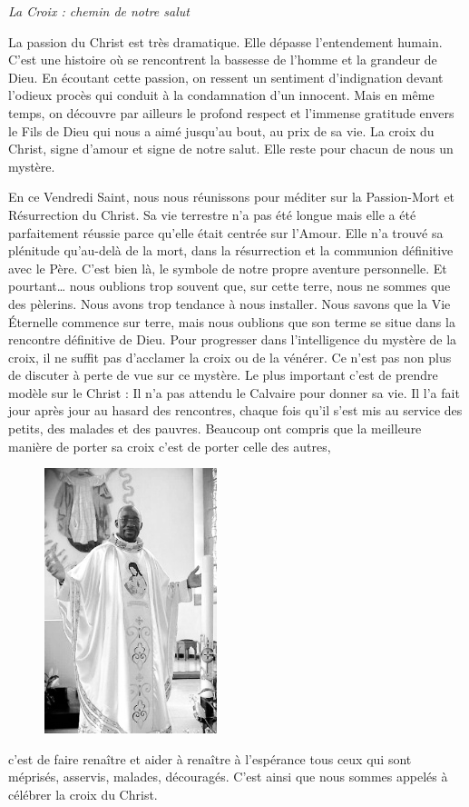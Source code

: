 \begin{center}
\og \textit{La Croix : chemin de notre salut} \fg
\end{center}

La passion du Christ est très dramatique. Elle dépasse l’entendement humain. C’est une histoire où se rencontrent la bassesse de l’homme et la grandeur de Dieu. En écoutant cette passion, on ressent un sentiment d’indignation devant l’odieux procès qui conduit à la condamnation d’un innocent. Mais en même temps, on découvre par ailleurs le profond respect et l’immense gratitude envers le Fils de Dieu qui nous a aimé jusqu’au bout, au prix de sa vie.
La croix du Christ, signe d’amour et signe de notre salut. Elle reste pour chacun de nous un mystère.

En ce Vendredi Saint, nous nous réunissons pour méditer sur la Passion-Mort et Résurrection du Christ. Sa vie terrestre n’a pas été longue mais elle a été parfaitement réussie parce qu’elle était centrée sur l’Amour. Elle n’a trouvé sa plénitude qu’au-delà de la mort, dans la résurrection et la communion définitive avec le Père. C’est bien là, le symbole de notre propre aventure personnelle. Et pourtant… nous oublions trop souvent que, sur cette terre, nous ne sommes que des pèlerins. Nous avons trop tendance à nous installer. Nous savons que la Vie Éternelle commence sur terre, mais nous oublions que son terme se situe dans la rencontre définitive de Dieu.
Pour progresser dans l’intelligence du mystère de la croix, il ne suffit pas d’acclamer la croix ou de la vénérer. Ce n’est pas non plus de discuter à perte de vue sur ce mystère. Le plus important c’est de prendre modèle sur le Christ : Il n’a pas attendu le Calvaire pour donner sa vie. Il l’a fait jour après jour au hasard des rencontres, chaque fois qu’il s’est mis au service des petits, des malades et des pauvres.
Beaucoup ont compris que la meilleure manière de porter sa croix c’est de porter celle des autres,
\begin{figure}
\vspace{-0.5cm}
\centering
	\includegraphics[scale=1.2]{standing_daniel.png}
\end{figure}
c’est de faire renaître et aider à renaître à l’espérance tous ceux qui sont méprisés, asservis, malades, découragés. C’est ainsi que nous sommes appelés à célébrer la croix du Christ.

